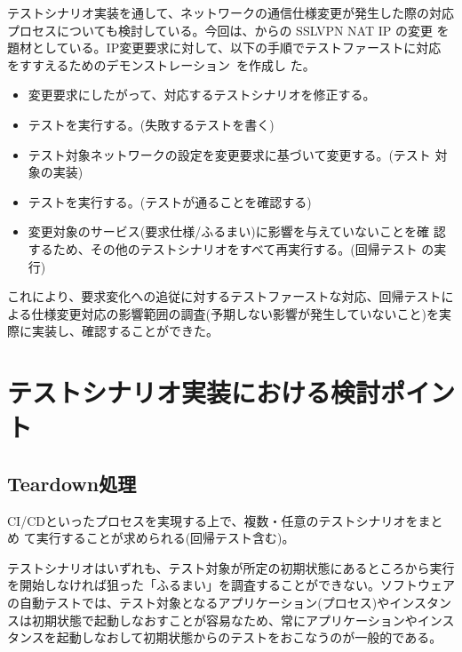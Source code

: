 テストシナリオ実装を通して、ネットワークの通信仕様変更が発生した際の対応
プロセスについても検討している。今回は、\tj からの SSLVPN NAT IP の変更
を題材としている。IP変更要求に対して、以下の手順でテストファーストに対応
をすすえるためのデモンストレーション~\cite{nettester-demo-movie}を作成し
た。
\begin{itemize}
 \item 変更要求にしたがって、対応するテストシナリオを修正する。
 \item テストを実行する。(失敗するテストを書く)
 \item テスト対象ネットワークの設定を変更要求に基づいて変更する。(テスト
       対象の実装)
 \item テストを実行する。(テストが通ることを確認する)
 \item 変更対象のサービス(要求仕様/ふるまい)に影響を与えていないことを確
       認するため、その他のテストシナリオをすべて再実行する。(回帰テスト
       の実行)
\end{itemize}
これにより、要求変化への追従に対するテストファーストな対応、回帰テストに
よる仕様変更対応の影響範囲の調査(予期しない影響が発生していないこと)を実
際に実装し、確認することができた。

 \section{テストシナリオ実装における検討ポイント}
 \label{sec:testscenario-impl-point}

  \subsection{Teardown処理}
  \label{sec:teardown}
CI/CDといったプロセスを実現する上で、複数・任意のテストシナリオをまとめ
て実行することが求められる(回帰テスト含む)。

テストシナリオはいずれも、テスト対象が所定の初期状態にあるところから実行
を開始しなければ狙った「ふるまい」を調査することができない。ソフトウェア
の自動テストでは、テスト対象となるアプリケーション(プロセス)やインスタン
スは初期状態で起動しなおすことが容易なため、常にアプリケーションやインス
タンスを起動しなおして初期状態からのテストをおこなうのが一般的である。

